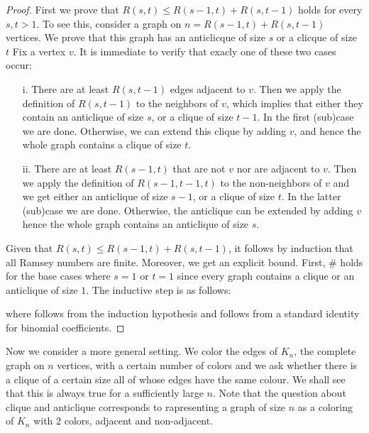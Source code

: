 \documentclass[scombinatorics.tex]{subfiles}
\begin{document}
\begin{proof}
  First we prove that $R(s, t) \le R(s-1, t) + R(s, t-1)$ holds for every $s,t>1$.
  To see this, consider a graph on $n = R(s-1, t) + R(s, t-1)$ vertices.
  We prove that this graph has an anticlicque of size $s$ or a clicque of size $t$
  Fix a vertex $v$.
  It is immediate to verify that exacly one of these two cases occur:
  \begin{itemize}
    \item[i.] There are at least $R(s, t-1)$ edges
    adjacent to $v$. 
    Then we apply the definition of $R(s, t-1)$ to the neighbors of $v$, which implies that either they contain an anticlique of size $s$, or a clique of size $t-1$.
    In the first (sub)case we are done.
    Otherwise, we can extend this clique by adding $v$, and hence the whole graph contains a clique of size $t$.
    \item[ii.] There are at least $R(s-1, t)$ that are not $v$ nor are adjacent to $v$.
    Then we apply the definition of $R(s-1, t-1, t)$ to the non-neighbors of $v$ and we get either an anticlique of size $s-1$, or a clique of size $t$.
    In the latter (sub)case we are done.
    Otherwise, the anticlique can be extended by adding $v$ hence the whole graph contains an anticlique of size $s$.
  \end{itemize}

Given that $R(s, t) \le R(s-1, t) + R(s, t-1)$, it follows by induction that all Ramsey numbers are finite. Moreover, we get an explicit bound.
First, \# holds for the base cases where $s = 1$ or $t = 1$ since every graph contains a clique or an anticlique of size $1$.
The inductive step is as follows:




where  follows from the induction hypothesis and  follows from a standard identity for binomial coefficients.
\end{proof}

Now we consider a more general setting.
We color the edges of $K_n$, the complete graph
on $n$ vertices, with a certain number of colors and we ask whether there is a clique of a certain size all of whose edges have the same colour.
We shall see that this is always true for a sufficiently large $n$.
Note that the question about clique and anticlique corresponds to rapresenting a graph of size $n$ as a coloring of $K_n$ with $2$ colors, adjacent and non-adjacent.
\end{document}
